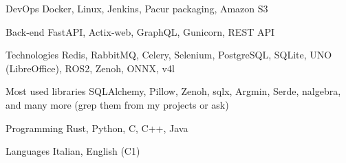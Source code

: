 
\begin{cvskills}

  \cvskill
  {DevOps} %
  {Docker, Linux, Jenkins, Pacur packaging, Amazon S3} %

  \cvskill
  {Back-end} %
  {FastAPI, Actix-web, GraphQL, Gunicorn, REST API} %

  \cvskill
  {Technologies} %
  {Redis, RabbitMQ, Celery, Selenium, PostgreSQL, SQLite, UNO
  (LibreOffice), ROS2, Zenoh, ONNX, v4l} %


  \cvskill
  {Most used libraries} %
  {SQLAlchemy, Pillow, Zenoh, sqlx, Argmin, Serde, nalgebra, and many
  more (grep them from my projects or ask)} %

  \cvskill
  {Programming} %
  {Rust, Python, C, C++, Java} %

  \cvskill
  {Languages} %
  {Italian, English (C1)} %

\end{cvskills}
